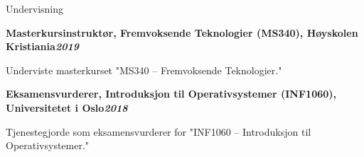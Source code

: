 \begin{rubric}{Undervisning}
\begin{compactitem}
    \vspace{-12pt}
\end{compactitem}
%
\entry*[]%
\textbf{Masterkursinstruktør, Fremvoksende Teknologier (MS340), Høyskolen Kristiania\hfill\textit{2019}} \par
\begin{compactitem}
    \item Underviste masterkurset "MS340 – Fremvoksende Teknologier."
    \vspace{-12pt}
\end{compactitem}
%
\entry*[]%
\textbf{Eksamensvurderer, Introduksjon til Operativsystemer (INF1060), Universitetet i Oslo\hfill\textit{2018}} \par
\begin{compactitem}
    \item Tjenestegjorde som eksamensvurderer for "INF1060 – Introduksjon til Operativsystemer."
    \vspace{-12pt}
\end{compactitem}
\end{rubric}

